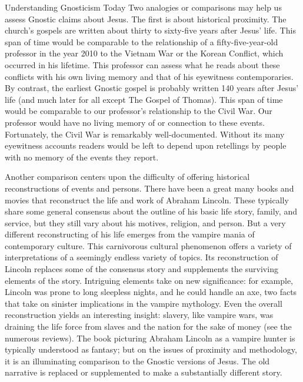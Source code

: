 \begin{sidebar}{Understanding Gnosticism Today}
Two analogies or comparisons may help us assess Gnostic claims about Jesus. The first is about
historical proximity. The church’s gospels are written about thirty to sixty-five years after Jesus’
life. This span of time would be comparable to the relationship of a fifty-five-year-old professor
in the year 2010 to the Vietnam War or the Korean Conflict, which occurred in his lifetime. This
professor can assess what he reads about these conflicts with his own living memory and that of his
eyewitness contemporaries. By contrast, the earliest Gnostic gospel is probably written 140 years
after Jesus’ life (and much later for all except The Gospel of Thomas). This span of time would be
comparable to our professor’s relationship to the Civil War. Our professor would have no living
memory of or connection to these events. Fortunately, the Civil War is remarkably well-documented.
Without its many eyewitness accounts readers would be left to depend upon retellings by people with
no memory of the events they report.

Another comparison centers upon the difficulty of offering historical reconstructions of events and
persons. There have been a great many books and movies that reconstruct the life and work of Abraham
Lincoln. These typically share some general consensus about the outline of his basic life story,
family, and service, but they still vary about his motives, religion, and person. But a very
different reconstructing of his life emerges from the vampire mania of contemporary culture. This
carnivorous cultural phenomenon offers a variety of interpretations of a seemingly endless variety
of topics. Its reconstruction of Lincoln replaces some of the consensus story and supplements the
surviving elements of the story. Intriguing elements take on new significance: for example, Lincoln
was prone to long sleepless nights, and he could handle an axe, two facts that take on sinister
implications in the vampire mythology. Even the overall reconstruction yields an interesting
insight: slavery, like vampire wars, was draining the life force from slaves and the nation for the
sake of money (see the numerous reviews). The book picturing Abraham Lincoln as a vampire hunter is
typically understood as fantasy; but on the issues of proximity and methodology, it is an
illuminating comparison to the Gnostic versions of Jesus. The old narrative is replaced or
supplemented to make a substantially different story.
\end{sidebar}

